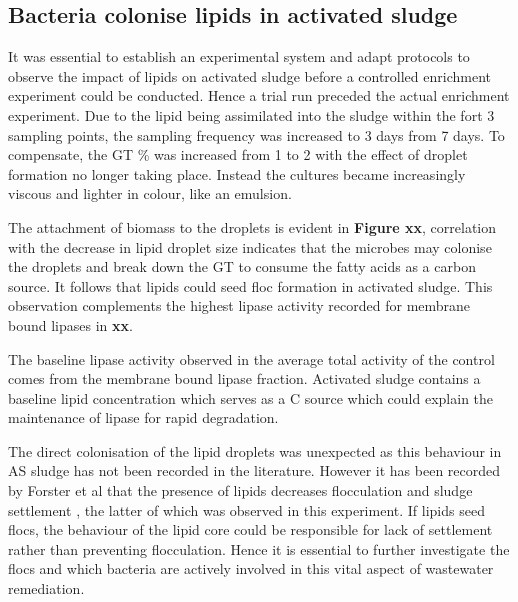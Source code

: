 \documentclass[11pt]{article}
\begin{document}
\subsection{Bacteria colonise lipids in activated sludge}

It was essential to establish an experimental system and adapt protocols to observe the impact of lipids on activated sludge before a controlled enrichment experiment could be conducted. Hence a trial run preceded the actual enrichment experiment. Due to the lipid being assimilated into the sludge within the fort 3 sampling points, the sampling frequency was increased to 3 days from 7 days. To compensate, the GT \% was increased from 1 to 2 with the effect of droplet formation no longer taking place. Instead the cultures became increasingly viscous and lighter in colour, like an emulsion. 


The attachment of biomass to the droplets is evident in \textbf{Figure xx}, correlation with the decrease in lipid droplet size indicates that the microbes may colonise the droplets and break down the GT to consume the fatty acids as a carbon source. It follows that lipids could seed floc formation in activated sludge. This observation complements the highest lipase activity recorded for membrane bound lipases in \textbf{xx}.

The baseline lipase activity observed in the average total activity of the control comes from the membrane bound lipase fraction. Activated sludge contains a baseline lipid concentration which serves as a C source which could explain the maintenance of lipase for rapid degradation. 

The direct colonisation of the lipid droplets was unexpected as this behaviour in AS sludge has not been recorded in the literature. However it has been recorded by Forster et al that the presence of lipids decreases flocculation and sludge settlement \cite{Forster_92}, the latter of which was observed in this experiment. If lipids seed flocs, the behaviour of the lipid core could be responsible for lack of settlement rather than preventing flocculation. Hence it is essential to further investigate the flocs and which bacteria are actively involved in this vital aspect of wastewater remediation.
\end{document}
